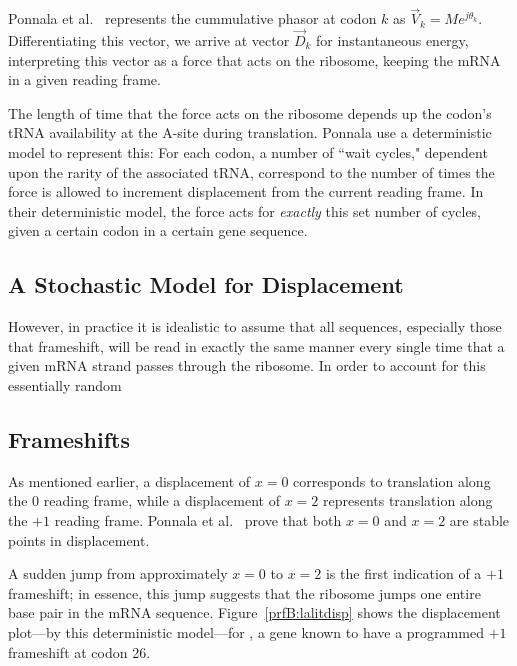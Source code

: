 \documentclass[12pt, draft]{article}
\begin{document}
Ponnala et al.~\cite{lalit:embs} represents the cummulative phasor at codon $k$ as $\vec{V}_k = Me^{j\theta_k}$.
Differentiating this vector, we arrive at vector $\vec{D}_k$ for instantaneous energy, interpreting this
vector as a force that acts on the ribosome, keeping the mRNA in a given reading frame.

The length of time that the force acts on the ribosome depends up the codon's tRNA availability at the A-site during translation.
Ponnala use a deterministic model to represent this: For each codon, a number
of ``wait cycles," dependent upon the rarity of the associated tRNA, correspond to the number
of times the force is allowed to increment displacement from the current reading frame.
In their deterministic model, the force acts for \emph{exactly} this set number of cycles, given a certain codon in a certain gene sequence.

\subsection{A Stochastic Model for Displacement}

However, in practice it is idealistic to assume that all sequences, especially those that frameshift, will be read in exactly the same manner every single time that a given mRNA strand passes through the ribosome.  In order to account for this essentially random 

\subsection{Frameshifts}


As mentioned earlier, a displacement of $x = 0$ corresponds to translation along the 0 reading frame,
while a displacement of $x = 2$ represents translation along the $+1$ reading frame.
Ponnala et al.~\cite{lalit:embs} prove that both $x = 0$ and $x = 2$ are stable points in displacement.


A sudden jump from approximately $x = 0$ to $x = 2$ is the first indication of a $+1$ frameshift; 
in essence, this jump suggests that the ribosome jumps one entire base pair in the mRNA sequence.
Figure~\ref{prfB:lalitdisp} shows the displacement plot---by this deterministic model---for \prfB, 
a gene known to have a programmed $+1$ frameshift at codon 26.
\end{document}
